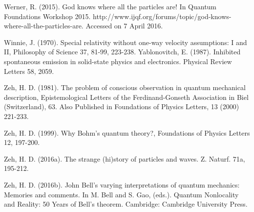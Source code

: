 \begin{thebibliography}{}
\bibitem{} Werner, R. (2015). God knows where all the particles are! In Quantum Foundations Workshop 2015. http://www.ijqf.org/forums/topic/god-knows-where-all-the-particles-are. Accessed on 7 April 2016.

\bibitem{} Winnie, J. (1970). Special relativity without one-way velocity assumptions: I and II, Philosophy of Science 37, 81-99, 223-238.
\bibitem{} Yablonovitch, E. (1987). Inhibited spontaneous emission in solid-state physics and electronics. Physical Review Letters 58, 2059.

\bibitem{} Zeh, H. D. (1981). The problem of conscious observation in quantum mechanical description, Epistemological Letters of the Ferdinand-Gonseth Association in Biel (Switzerland), 63. Also Published in Foundations of Physics Letters, 13 (2000) 221-233.

\bibitem{} Zeh, H. D. (1999). Why Bohm's quantum theory?, Foundations of Physics Letters 12, 197-200.

\bibitem{} Zeh, H. D. (2016a). The strange (hi)story of particles and waves. Z. Naturf. 71a, 195-212.

\bibitem{} Zeh, H. D. (2016b). John Bell's varying interpretations of quantum mechanics: Memories and
comments. In M. Bell and S. Gao, (eds.). Quantum Nonlocality and Reality: 50 Years of Bell’s theorem. Cambridge: Cambridge University Press.

\end{thebibliography}

